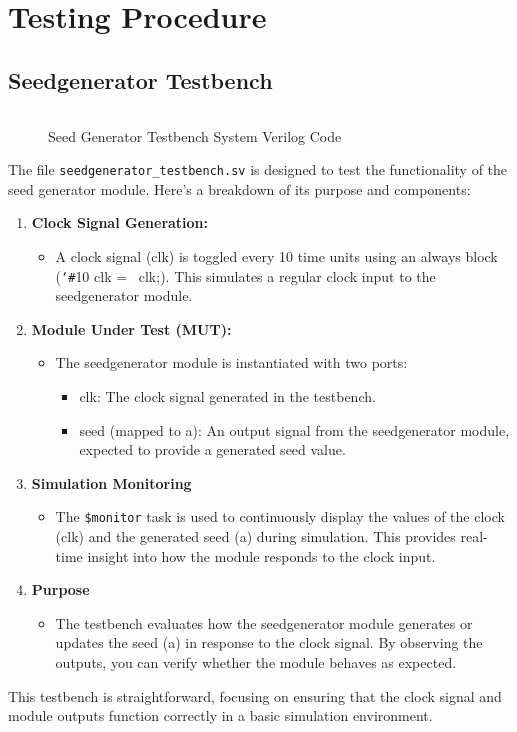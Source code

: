 \documentclass{report}
\begin{document}
\chapter{Testing Procedure}

\section{Seedgenerator Testbench}
\begin{figure}[H]
    \inputminted{sv}{../seedgenerator_testbench.sv}
    \caption{Seed Generator Testbench System Verilog Code}
\end{figure}
The file \verb|seedgenerator_testbench.sv| is designed to test the functionality of the seed generator module. Here's a breakdown of its purpose and components:
\begin{enumerate}
    \item \textbf{Clock Signal Generation:}
    \begin{itemize}
        \item A clock signal (clk) is toggled every 10 time units using an always block (\texttt{\char`#}10 clk = ~clk;). This simulates a regular clock input to the seedgenerator module.
    \end{itemize}
    \item \textbf{Module Under Test (MUT):}
    \begin{itemize}
        \item The seedgenerator module is instantiated with two ports:
        \begin{itemize}
            \item clk: The clock signal generated in the testbench.
            \item seed (mapped to a): An output signal from the seedgenerator module, expected to provide a generated seed value.
        \end{itemize}
    \end{itemize}
    \item \textbf{Simulation Monitoring}
    \begin{itemize}
        \item The \verb|$monitor| task is used to continuously display the values of the clock (clk) and the generated seed (a) during simulation. This provides real-time insight into how the module responds to the clock input.
    \end{itemize}
    \item \textbf{Purpose}
    \begin{itemize}
        \item The testbench evaluates how the seedgenerator module generates or updates the seed (a) in response to the clock signal. By observing the outputs, you can verify whether the module behaves as expected.
    \end{itemize}
\end{enumerate}
This testbench is straightforward, focusing on ensuring that the clock signal and module outputs function correctly in a basic simulation environment.
\end{document}
